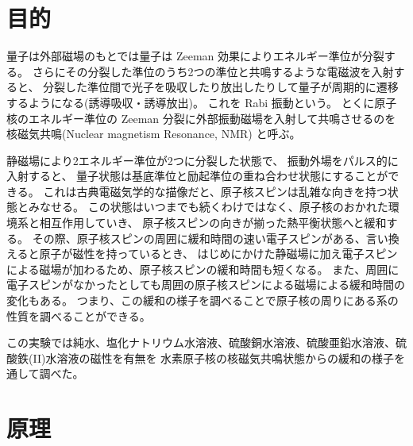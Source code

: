 \documentclass[11pt,dvipdfmx,a4paper]{jsarticle}
\begin{document}
\section{目的}
量子は外部磁場のもとでは量子は Zeeman 効果によりエネルギー準位が分裂する。
さらにその分裂した準位のうち2つの準位と共鳴するような電磁波を入射すると、
分裂した準位間で光子を吸収したり放出したりして量子が周期的に遷移するようになる(誘導吸収・誘導放出)。
これを Rabi 振動という。
とくに原子核のエネルギー準位の Zeeman 分裂に外部振動磁場を入射して共鳴させるのを
核磁気共鳴(Nuclear magnetism Resonance, NMR) と呼ぶ。

静磁場により2エネルギー準位が2つに分裂した状態で、
振動外場をパルス的に入射すると、
量子状態は基底準位と励起準位の重ね合わせ状態にすることができる。
これは古典電磁気学的な描像だと、原子核スピンは乱雑な向きを持つ状態とみなせる。
この状態はいつまでも続くわけではなく、原子核のおかれた環境系と相互作用していき、
原子核スピンの向きが揃った熱平衡状態へと緩和する。
その際、原子核スピンの周囲に緩和時間の速い電子スピンがある、言い換えると原子が磁性を持っているとき、
はじめにかけた静磁場に加え電子スピンによる磁場が加わるため、原子核スピンの緩和時間も短くなる。
また、周囲に電子スピンがなかったとしても周囲の原子核スピンによる磁場による緩和時間の変化もある。
つまり、この緩和の様子を調べることで原子核の周りにある系の性質を調べることができる。

この実験では純水、塩化ナトリウム水溶液、硫酸銅水溶液、硫酸亜鉛水溶液、硫酸鉄(II)水溶液の磁性を有無を
水素原子核の核磁気共鳴状態からの緩和の様子を通して調べた。

\section{原理}
\end{document}
